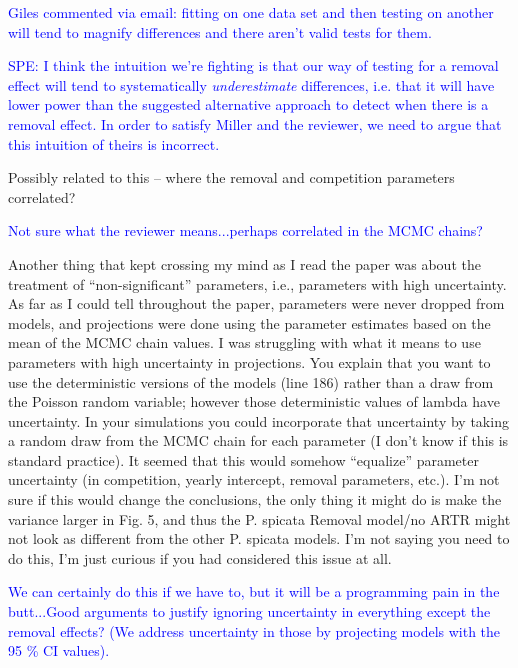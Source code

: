 \documentclass[12pt]{article}
\newcommand{\response}{\textcolor{blue}}
\begin{document}
{\response{Giles commented via email: fitting on one data set and then testing on another will tend to magnify differences and there aren’t valid tests for them. }

\response{SPE: I think the intuition we're fighting is that our way of testing for a removal effect will tend to systematically \emph{underestimate} differences, i.e. that it will have
lower power than the suggested alternative approach to detect when there is a removal effect. In order to satisfy Miller and the reviewer, we need to argue that this intuition of theirs
is incorrect.}  

Possibly related to this – where the removal and competition parameters correlated?

\response{Not sure what the reviewer means...perhaps correlated in the MCMC chains?}

Another thing that kept crossing my mind as I read the paper was about the treatment of “non-significant” parameters, i.e., parameters with high uncertainty. As far as I could tell throughout the paper, parameters were never dropped from models, and projections were done using the parameter estimates based on the mean of the MCMC chain values. I was struggling with what it means to use parameters with high uncertainty in projections. You explain that you want to use the deterministic versions of the models (line 186) rather than a draw from the Poisson random variable; however those deterministic values of lambda have uncertainty. In your simulations you could incorporate that uncertainty by taking a random draw from the MCMC chain for each parameter (I don't know if this is standard practice). It seemed that this would somehow “equalize” parameter uncertainty (in competition, yearly intercept, removal parameters, etc.). I’m not sure if this would change the conclusions, the only thing it might do is make the variance larger in Fig. 5, and thus the P. spicata Removal model/no ARTR might not look as different from the other P. spicata models. I’m not saying you need to do this, I’m just curious if you had considered this issue at all.

\response{We can certainly do this if we have to, but it will be a programming pain in the butt...Good arguments to justify ignoring uncertainty in everything except the removal effects? (We address uncertainty in those by projecting models with the 95 \% CI values). }

}
\end{document}
